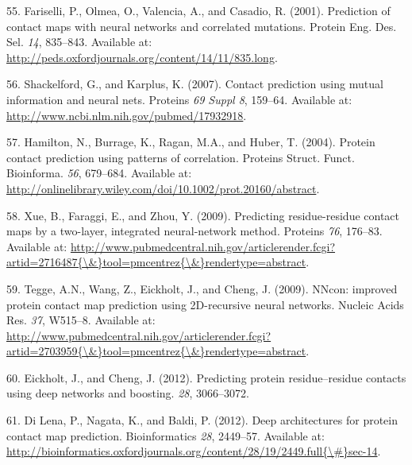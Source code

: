 \documentclass[12pt,a4paper,twoside]{book}
\theoremstyle{definition}
\theoremstyle{definition}
\theoremstyle{remark}
\begin{document}
\hypertarget{ref-Fariselli2001a}{}
55. Fariselli, P., Olmea, O., Valencia, A., and Casadio, R. (2001).
Prediction of contact maps with neural networks and correlated
mutations. Protein Eng. Des. Sel. \emph{14}, 835--843. Available at:
\url{http://peds.oxfordjournals.org/content/14/11/835.long}.

\hypertarget{ref-Shackelford2007}{}
56. Shackelford, G., and Karplus, K. (2007). Contact prediction using
mutual information and neural nets. Proteins \emph{69 Suppl 8}, 159--64.
Available at: \url{http://www.ncbi.nlm.nih.gov/pubmed/17932918}.

\hypertarget{ref-Hamilton2004a}{}
57. Hamilton, N., Burrage, K., Ragan, M.A., and Huber, T. (2004).
Protein contact prediction using patterns of correlation. Proteins
Struct. Funct. Bioinforma. \emph{56}, 679--684. Available at:
\url{http://onlinelibrary.wiley.com/doi/10.1002/prot.20160/abstract}.

\hypertarget{ref-Xue2009a}{}
58. Xue, B., Faraggi, E., and Zhou, Y. (2009). Predicting
residue-residue contact maps by a two-layer, integrated neural-network
method. Proteins \emph{76}, 176--83. Available at:
\href{http://www.pubmedcentral.nih.gov/articlerender.fcgi?artid=2716487\%7B/\&\%7Dtool=pmcentrez\%7B/\&\%7Drendertype=abstract}{http://www.pubmedcentral.nih.gov/articlerender.fcgi?artid=2716487\{\textbackslash{}\&\}tool=pmcentrez\{\textbackslash{}\&\}rendertype=abstract}.

\hypertarget{ref-Tegge2009a}{}
59. Tegge, A.N., Wang, Z., Eickholt, J., and Cheng, J. (2009). NNcon:
improved protein contact map prediction using 2D-recursive neural
networks. Nucleic Acids Res. \emph{37}, W515--8. Available at:
\href{http://www.pubmedcentral.nih.gov/articlerender.fcgi?artid=2703959\%7B/\&\%7Dtool=pmcentrez\%7B/\&\%7Drendertype=abstract}{http://www.pubmedcentral.nih.gov/articlerender.fcgi?artid=2703959\{\textbackslash{}\&\}tool=pmcentrez\{\textbackslash{}\&\}rendertype=abstract}.

\hypertarget{ref-Eickholt2012}{}
60. Eickholt, J., and Cheng, J. (2012). Predicting protein
residue--residue contacts using deep networks and boosting. \emph{28},
3066--3072.

\hypertarget{ref-DiLena2012a}{}
61. Di Lena, P., Nagata, K., and Baldi, P. (2012). Deep architectures
for protein contact map prediction. Bioinformatics \emph{28}, 2449--57.
Available at:
\href{http://bioinformatics.oxfordjournals.org/content/28/19/2449.full\%7B/\#\%7Dsec-14}{http://bioinformatics.oxfordjournals.org/content/28/19/2449.full\{\textbackslash{}\#\}sec-14}.
\end{document}
